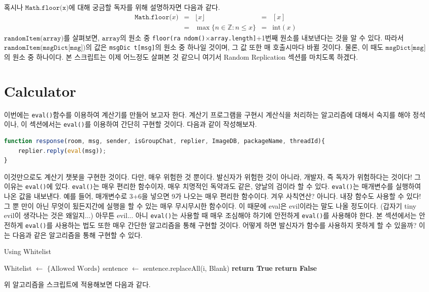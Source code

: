 \documentclass[10pt,b6paper,final]{book}
\begin{document}
혹시나 $\texttt{Math.floor(x)}$에 대해 궁금할 독자를 위해 설명하자면 다음과 같다.
\[
\begin{matrix}
\texttt{Math.floor(}x\texttt{)} &=& \lfloor x\rfloor &=& [x]\\
       &=& \max\{n\in \mathbb {Z} \colon n\leq x\} &=& \text{int}(x)
\end{matrix}
\]
$\texttt{randomItem(array)}$를 살펴보면, $\texttt{array}$의 원소 중 \texttt{floor(ra ndom()$\times$array.length]}+1번째 원소를
내보낸다는 것을 알 수 있다. 따라서 $\texttt{randomItem(msgDict[msg])}$의 값은 \texttt{msgDic t[msg]}의 원소 중
하나일 것이며, 그 값 또한 매 호출시마다 바뀔 것이다. 물론, 이 때도 $\texttt{msgDict[msg]}$의 원소 중 하나이다. 본 스크립트는 이제
어느정도 살펴본 것 같으니 여기서 Random Replication 섹션를 마치도록 하겠다.

\section{Calculator}
이번에는 \texttt{eval()}함수를 이용하여 계산기를 만들어 보고자 한다. 계산기 프로그램을 구현시 계산식을 처리하는 알고리즘에 대해서
숙지를 해야 정석이나, 이 섹션에서는 \texttt{eval()}를 이용하여 간단히 구현할 것이다. 다음과 같이 작성해보자.
\begin{lstlisting}[language=JavaScript,escapeinside=@@]
function response(room, msg, sender, isGroupChat, replier, ImageDB, packageName, threadId){
    replier.reply(eval(msg));
}
\end{lstlisting}
이것만으로도 계산기 챗봇을 구현한 것이다. 다만, 매우 위험한 것 뿐이다. 발신자가 위험한 것이 아니라,
개발자, 즉 독자가 위험하다는 것이다! 그 이유는 \texttt{eval()}에 있다. \texttt{eval()}는 매우 편리한 함수이자,
매우 치명적인 독약과도 같은, 양날의 검이라 할 수 있다.
\texttt{eval()}는 매개변수를 실행하여 나온 값을 내보낸다. 예를 들어, 매개변수로 3+6을 넣으면 9가 나오는 매우 편리한 함수이다.
겨우 사칙연산? 아니다. 내장 함수도 사용할 수 있다! 그 뿐 만이 아닌 무엇이 됬든지간에 실행을 할 수 있는 매우 무시무시한 함수이다.
이 때문에 eval은 evil이라는 말도 나올 정도이다. (갑자기 tiny evil이 생각나는 것은 왜일지...) 아무튼
evil... 아니 \texttt{eval()}는 사용할 때 매우 조심해야 하기에 안전하게 \texttt{eval()}를 사용해야 한다.
본 섹션에서는 안전하게 \texttt{eval()}를 사용하는 법도 또한 매우 간단한 알고리즘을 통해 구현할 것이다.
어떻게 하면 발신자가 함수를 사용하지 못하게 할 수 있을까? 이는 다음과 같은 알고리즘을 통해 구현할 수 있다.
\newpage
\begin{algorithm}
        \caption{Using Whitelist}\label{euclid}
        \begin{algorithmic}[1]
            \State Whitelist $\gets $ $\{\text{Allowed Words}\}$
                \State sentence $\gets$ sentence.replaceAll(i, Blank)
            \EndFor
            	\State \textbf{return True}
            \Else
            	\State \textbf{return False}
            \EndIf
            \EndProcedure
        \end{algorithmic}\end{algorithm}위 알고리즘을 스크립트에 적용해보면 다음과 같다.
\end{document}
